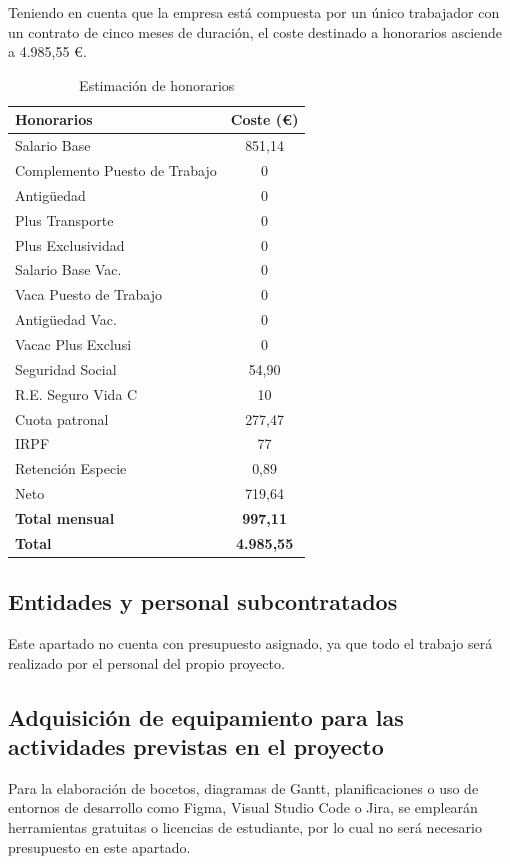 Teniendo en cuenta que la empresa está compuesta por un único trabajador con un contrato de cinco meses de duración, el coste destinado a honorarios asciende a 4.985,55 €.

\begin{table}[h]
\centering
{}

\begin{tabular}{lc}
\toprule
\rowcolor{grisfila}
\textbf{Honorarios} & \textbf{Coste (€)} \\
\midrule
Salario Base & 851,14 \\
Complemento Puesto de Trabajo & 0 \\
Antigüedad & 0 \\
Plus Transporte	& 0 \\
Plus Exclusividad & 0 \\
Salario Base Vac. & 0 \\
Vaca Puesto de Trabajo & 0 \\
Antigüedad Vac. & 0 \\
Vacac Plus Exclusi & 0 \\
Seguridad Social & 54,90 \\
R.E. Seguro Vida C & 10 \\
Cuota patronal & 277,47 \\
IRPF & 77 \\
Retención Especie & 0,89 \\
Neto & 719,64 \\
\textbf{Total mensual} & \textbf{997,11} \\
\midrule
\textbf{Total} & \textbf{4.985,55} \\
\bottomrule
\end{tabular}
\caption{Estimación de honorarios}
\label{tab:honorarios}
\end{table}

\subsection{Entidades y personal subcontratados}
Este apartado no cuenta con presupuesto asignado, ya que todo el trabajo será realizado por el personal del propio proyecto.

\subsection{Adquisición de equipamiento para las actividades previstas en el proyecto}

Para la elaboración de bocetos, diagramas de Gantt, planificaciones o uso de entornos de desarrollo como Figma, Visual Studio Code o Jira, se emplearán herramientas gratuitas o licencias de estudiante, por lo cual no será necesario presupuesto en este apartado. \\

